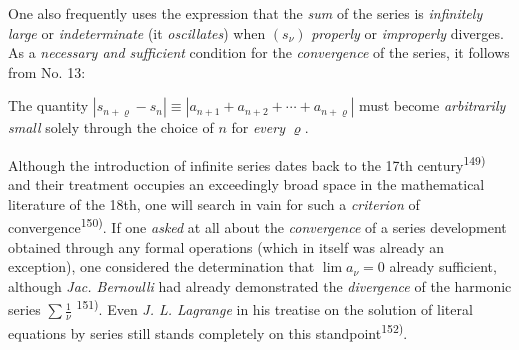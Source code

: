 \thispagestyle{fancy}

\vspace{0.5cm}

One also frequently uses the expression that the \textit{sum} of the series is \textit{infinitely large} or \textit{indeterminate} (it \textit{oscillates}) when $(s_\nu)$ \textit{properly} or \textit{improperly} diverges. As a \textit{necessary and sufficient} condition for the \textit{convergence} of the series, it follows from No. 13:

The quantity $|s_{n+\varrho} - s_n| \equiv |a_{n+1} + a_{n+2} + \cdots + a_{n+\varrho}|$ must become \textit{arbitrarily small} solely through the choice of $n$ for \textit{every} $\varrho$.

Although the introduction of infinite series dates back to the 17th century\textsuperscript{149)} and their treatment occupies an exceedingly broad space in the mathematical literature of the 18th, one will search in vain for such a \textit{criterion} of convergence\textsuperscript{150)}. If one \textit{asked} at all about the \textit{convergence} of a series development obtained through any formal operations (which in itself was already an exception), one considered the determination that $\lim a_\nu = 0$ already sufficient, although \textit{Jac. Bernoulli} had already demonstrated the \textit{divergence} of the harmonic series $\sum \frac{1}{\nu}$ \textsuperscript{151)}. Even \textit{J. L. Lagrange} in his treatise on the solution of literal equations by series still stands completely on this standpoint\textsuperscript{152)}.

